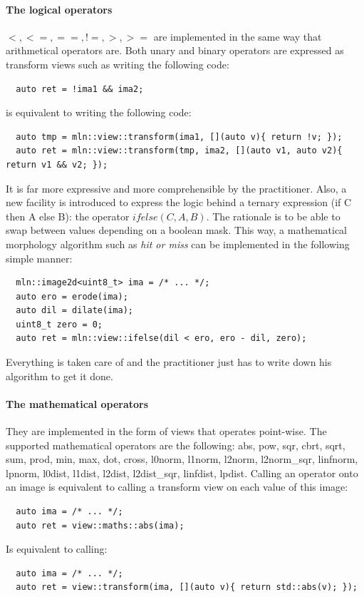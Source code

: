 \paragraph{The logical operators} \(<, <=, ==, !=, >, >=\) are implemented in the same way that arithmetical operators
are. Both unary and binary operators are expressed as transform views such as writing the following code:
\begin{verbatim}
  auto ret = !ima1 && ima2;
\end{verbatim}
is equivalent to writing the following code:
\begin{verbatim}
  auto tmp = mln::view::transform(ima1, [](auto v){ return !v; });
  auto ret = mln::view::transform(tmp, ima2, [](auto v1, auto v2){ return v1 && v2; });
\end{verbatim}
It is far more expressive and more comprehensible by the practitioner. Also, a new facility is introduced to express the
logic behind a ternary expression (if C then A else B): the operator \(ifelse(C, A, B)\). The rationale is to be able to
swap between values depending on a boolean mask. This way, a mathematical morphology algorithm such as \emph{hit or
  miss} can be implemented in the following simple manner:
\begin{verbatim}
  mln::image2d<uint8_t> ima = /* ... */;
  auto ero = erode(ima);
  auto dil = dilate(ima);
  uint8_t zero = 0;
  auto ret = mln::view::ifelse(dil < ero, ero - dil, zero);
\end{verbatim}
Everything is taken care of and the practitioner just has to write down his algorithm to get it done.

\paragraph{The mathematical operators} They are implemented in the form of views that operates point-wise. The supported
mathematical operators are the following: abs, pow, sqr, cbrt, sqrt, sum, prod, min, max, dot, cross, l0norm, l1norm,
l2norm, l2norm\_sqr, linfnorm, lpnorm, l0dist, l1dist, l2dist, l2dist\_sqr, linfdist, lpdist. Calling an operator onto
an image is equivalent to calling a transform view on each value of this image:
\begin{verbatim}
  auto ima = /* ... */;
  auto ret = view::maths::abs(ima);
\end{verbatim}
Is equivalent to calling:
\begin{verbatim}
  auto ima = /* ... */;
  auto ret = view::transform(ima, [](auto v){ return std::abs(v); });
\end{verbatim}


